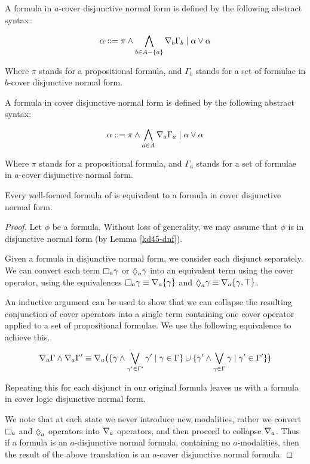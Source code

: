 \begin{definition}
A formula in $a$-cover disjunctive normal form is defined by the following
abstract syntax:

$$
\alpha ::= \pi \land \bigwedge_{b \in A - \{a\}} \nabla_b \Gamma_b \mid
\alpha \lor \alpha
$$

Where $\pi$ stands for a propositional formula, and $\Gamma_b$ stands for a set
of formulae in $b$-cover disjunctive normal form.

A formula in cover disjunctive normal form is defined by the following abstract
syntax:

$$
\alpha ::= \pi \land \bigwedge_{a \in A} \nabla_a \Gamma_a \mid
\alpha \lor \alpha
$$

Where $\pi$ stands for a propositional formula, and $\Gamma_a$ stands for a set
of formulae in $a$-cover disjunctive normal form.
\end{definition}

\begin{lemma}
Every well-formed formula of \logicKD{} is equivalent to a formula in
cover disjunctive normal form.
\end{lemma}

\begin{proof}
Let $\phi$ be a \logicKD{} formula.  Without loss of generality, we may assume
that $\phi$ is in disjunctive normal form (by Lemma \ref{kd45-dnf}).

Given a formula in disjunctive normal form, we consider each disjunct separately. We
can convert each term $\knows_a \gamma$ or $\suspects_a \gamma$ into an equivalent
term using the cover operator, using the equivalences $\knows_a \gamma \equiv
\covers_a \{ \gamma \}$ and $\suspects_a \gamma \equiv \covers_a \{ \gamma, \top
\}$.

An inductive argument can be used to show that we can collapse the resulting
conjunction of cover operators into a single term containing one cover
operator applied to a set of propositional formulae. We use the following
equivalence to achieve this.

$$
\nabla_a \Gamma \land \nabla_a \Gamma' \equiv 
\nabla_a \big( 
\{ \gamma \land \bigvee_{\gamma' \in \Gamma'} \gamma' \mid \gamma \in \Gamma \}
\cup
\{ \gamma' \land \bigvee_{\gamma \in \Gamma} \gamma \mid \gamma' \in \Gamma' \}
\big)
$$

Repeating this for each disjunct in our original formula leaves us with a
formula in cover logic disjunctive normal form.

We note that at each state we never introduce new modalities, rather we convert
$\knows_a$ and $\suspects_a$ operators into $\nabla_a$ operators, and then
proceed to collapse $\nabla_a$. Thus if a formula is an $a$-disjunctive normal
formula, containing no $a$-modalities, then the result of the above translation
is an $a$-cover disjunctive normal formula.
\end{proof}

